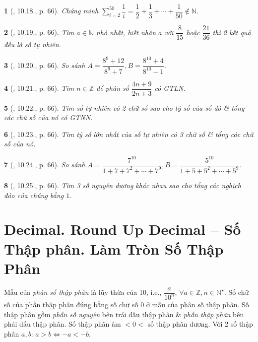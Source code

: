 \documentclass{article}
\newtheorem{baitoan}{}
\begin{document}
\begin{baitoan}[\cite{TLCT_THCS_Toan_6_so_hoc}, 10.18., p. 66]
	Chứng minh $\sum_{i=2}^{50} \dfrac{1}{i} = \dfrac{1}{2} + \dfrac{1}{3} + \cdots + \dfrac{1}{50}\notin\mathbb{N}$.
\end{baitoan}

\begin{baitoan}[\cite{TLCT_THCS_Toan_6_so_hoc}, 10.19., p. 66]
	Tìm $a\in\mathbb{N}$ nhỏ nhất, biết nhân $a$ với $\dfrac{8}{15}$ hoặc $\dfrac{21}{36}$ thì 2 kết quả đều là số tự nhiên.
\end{baitoan}

\begin{baitoan}[\cite{TLCT_THCS_Toan_6_so_hoc}, 10.20., p. 66]
	So sánh $A = \dfrac{8^9 + 12}{8^9 + 7},B = \dfrac{8^{10} + 4}{8^{10} - 1}$.
\end{baitoan}

\begin{baitoan}[\cite{TLCT_THCS_Toan_6_so_hoc}, 10.21., p. 66]
	Tìm $n\in\mathbb{Z}$ để phân số $\dfrac{4n + 9}{2n + 3}$ có {\rm GTLN}.
\end{baitoan}

\begin{baitoan}[\cite{TLCT_THCS_Toan_6_so_hoc}, 10.22., p. 66]
	Tìm số tự nhiên có 2 chữ số sao cho tỷ số của số đó \& tổng các chữ số của nó có {\rm GTNN}.
\end{baitoan}

\begin{baitoan}[\cite{TLCT_THCS_Toan_6_so_hoc}, 10.23., p. 66]
	Tìm tỷ số lớn nhất của số tự nhiên có 3 chữ số \& tổng các chữ số của nó.
\end{baitoan}

\begin{baitoan}[\cite{TLCT_THCS_Toan_6_so_hoc}, 10.24., p. 66]
	So sánh $A = \dfrac{7^{10}}{1 + 7 + 7^2 + \cdots + 7^9},B = \dfrac{5^{10}}{1 + 5 + 5^2 + \cdots + 5^9}$.
\end{baitoan}

\begin{baitoan}[\cite{TLCT_THCS_Toan_6_so_hoc}, 10.25., p. 66]
	Tìm 3 số nguyên dương khác nhau sao cho tổng các nghịch đảo của chúng bằng $1$.
\end{baitoan}


\section{Decimal. Round Up Decimal -- Số Thập phân. Làm Tròn Số Thập Phân}
 Mẫu của \textit{phân số thập phân} là lũy thừa của 10, i.e., $\dfrac{a}{10^n}$, $\forall a\in\mathbb{Z},n\in\mathbb{N}^\star$.  Số chữ số của phần thập phân đúng bằng số chữ số 0 ở mẫu của phân số thập phân.  Số thập phân gồm \textit{phần số nguyên} bên trái dấu thập phân \& \textit{phần thập phân} bên phải dấu thập phân.  Số thập phân âm $< 0 <$ số thập phân dương.  Với 2 số thập phân $a,b$: $a > b\Leftrightarrow -a < -b$.\\
\end{document}
